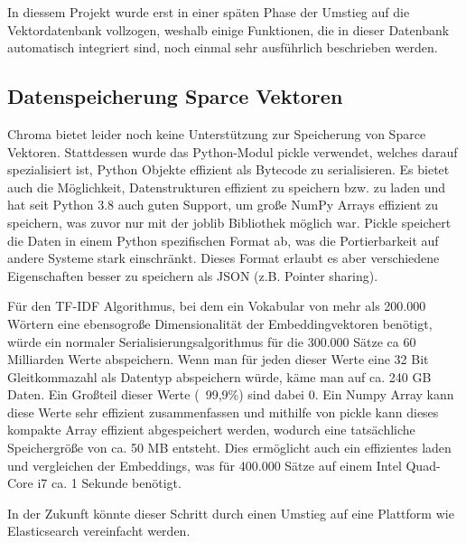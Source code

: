 In diessem Projekt wurde erst in einer späten Phase der Umstieg auf die Vektordatenbank vollzogen, weshalb einige Funktionen, die in dieser Datenbank automatisch integriert sind, noch einmal sehr ausführlich beschrieben werden.


\subsection{Datenspeicherung Sparce Vektoren}

Chroma bietet leider noch keine Unterstützung zur Speicherung von Sparce Vektoren.
Stattdessen wurde das Python-Modul pickle verwendet, welches darauf spezialisiert ist, Python Objekte effizient als Bytecode zu serialisieren. 
Es bietet auch die Möglichkeit, Datenstrukturen effizient zu speichern bzw. zu laden und hat seit Python 3.8 auch guten Support, um große NumPy Arrays effizient zu speichern, was zuvor nur mit der joblib Bibliothek möglich war.
Pickle speichert die Daten in einem Python spezifischen Format ab, was die Portierbarkeit auf andere Systeme stark einschränkt. Dieses Format erlaubt es aber verschiedene Eigenschaften besser zu speichern als JSON (z.B. Pointer sharing).

Für den TF-IDF Algorithmus, bei dem ein Vokabular von mehr als 200.000 Wörtern eine ebensogroße Dimensionalität der Embeddingvektoren benötigt, würde ein normaler Serialisierungsalgorithmus für die 300.000 Sätze ca 60 Milliarden Werte abspeichern.
Wenn man für jeden dieser Werte eine 32 Bit Gleitkommazahl als Datentyp abspeichern würde, käme man auf ca. 240 GB Daten. 
Ein Großteil dieser Werte (~99,9\%) sind dabei 0.
Ein Numpy Array kann diese Werte sehr effizient zusammenfassen und mithilfe von pickle kann dieses kompakte Array effizient abgespeichert werden, wodurch eine tatsächliche Speichergröße von ca. 50 MB entsteht.
Dies ermöglicht auch ein effizientes laden und vergleichen der Embeddings, was für 400.000 Sätze auf einem Intel Quad-Core i7 ca. 1 Sekunde benötigt.

In der Zukunft könnte dieser Schritt durch einen Umstieg auf eine Plattform wie Elasticsearch vereinfacht werden.






